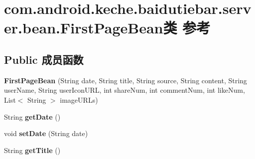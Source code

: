 \hypertarget{classcom_1_1android_1_1keche_1_1baidutiebar_1_1server_1_1bean_1_1_first_page_bean}{}\section{com.\+android.\+keche.\+baidutiebar.\+server.\+bean.\+First\+Page\+Bean类 参考}
\label{classcom_1_1android_1_1keche_1_1baidutiebar_1_1server_1_1bean_1_1_first_page_bean}
\subsection*{Public 成员函数}
\begin{DoxyCompactItemize}
\item 
\mbox{\label{classcom_1_1android_1_1keche_1_1baidutiebar_1_1server_1_1bean_1_1_first_page_bean_af217dd32fae9cc36860970d490d14025}} 
{\bfseries First\+Page\+Bean} (String date, String title, String source, String content, String user\+Name, String user\+Icon\+U\+RL, int share\+Num, int comment\+Num, int like\+Num, List$<$ String $>$ image\+U\+R\+Ls)
\item 
\mbox{\label{classcom_1_1android_1_1keche_1_1baidutiebar_1_1server_1_1bean_1_1_first_page_bean_aca8c23da44b8048393c7d8fd4544f837}} 
String {\bfseries get\+Date} ()
\item 
\mbox{\label{classcom_1_1android_1_1keche_1_1baidutiebar_1_1server_1_1bean_1_1_first_page_bean_a755f1c1346cff4849d5054806e2cbfe3}} 
void {\bfseries set\+Date} (String date)
\item 
\mbox{\label{classcom_1_1android_1_1keche_1_1baidutiebar_1_1server_1_1bean_1_1_first_page_bean_a8eb13bd3d0930fa636fc35dfa75e1d70}} 
String {\bfseries get\+Title} ()
\item 
\mbox{\label{classcom_1_1android_1_1keche_1_1baidutiebar_1_1server_1_1bean_1_1_first_page_bean_ad8aec9d6c03f41ed92ae895efd7fd0fa}} 

\end{DoxyCompactItemize}
